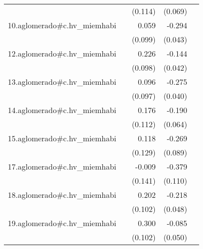 {\begin{longtable}{l*{4}{D{.}{.}{-1}}}
            &                     &     (0.114)         &     (0.069)         &                     \\
\addlinespace
10.aglomerado#c.hv\_miemhabi&                     &       0.059         &      -0.294\sym{***}&                     \\
            &                     &     (0.099)         &     (0.043)         &                     \\
\addlinespace
12.aglomerado#c.hv\_miemhabi&                     &       0.226\sym{*}  &      -0.144\sym{***}&                     \\
            &                     &     (0.098)         &     (0.042)         &                     \\
\addlinespace
13.aglomerado#c.hv\_miemhabi&                     &       0.096         &      -0.275\sym{***}&                     \\
            &                     &     (0.097)         &     (0.040)         &                     \\
\addlinespace
14.aglomerado#c.hv\_miemhabi&                     &       0.176         &      -0.190\sym{**} &                     \\
            &                     &     (0.112)         &     (0.064)         &                     \\
\addlinespace
15.aglomerado#c.hv\_miemhabi&                     &       0.118         &      -0.269\sym{**} &                     \\
            &                     &     (0.129)         &     (0.089)         &                     \\
\addlinespace
17.aglomerado#c.hv\_miemhabi&                     &      -0.009         &      -0.379\sym{***}&                     \\
            &                     &     (0.141)         &     (0.110)         &                     \\
\addlinespace
18.aglomerado#c.hv\_miemhabi&                     &       0.202\sym{*}  &      -0.218\sym{***}&                     \\
            &                     &     (0.102)         &     (0.048)         &                     \\
\addlinespace
19.aglomerado#c.hv\_miemhabi&                     &       0.300\sym{**} &      -0.085         &                     \\
            &                     &     (0.102)         &     (0.050)         &                     \\

\end{longtable}}
